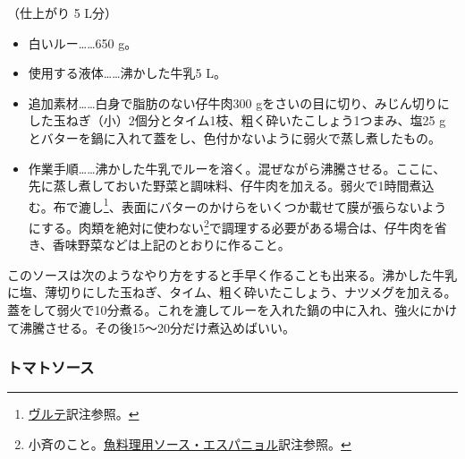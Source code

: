 \begin{recette}


（仕上がり 5 L分）

\begin{itemize}
\item
  白いルー\ldots{}\ldots{}650 g。
\item
  使用する液体\ldots{}\ldots{}沸かした牛乳5 L。
\item
  追加素材\ldots{}\ldots{}白身で脂肪のない仔牛肉300
  gをさいの目に切り、みじん切りにした玉ねぎ（小）2個分とタイム1枝、粗く砕いたこしょう1つまみ、塩25
  g とバターを鍋に入れて蓋をし、色付かないように弱火で蒸し煮したもの。
\item
  作業手順\ldots{}\ldots{}沸かした牛乳でルーを溶く。混ぜながら沸騰させる。ここに、先に蒸し煮しておいた野菜と調味料、仔牛肉を加える。弱火で1時間煮込む。布で漉し\footnote{\protect\hyperlink{veloute}{ヴルテ}訳注参照。}、表面にバターのかけらをいくつか載せて膜が張らないようにする。肉類を絶対に使わない\footnote{小斉のこと。\protect\hyperlink{sauce-espagnole-maigre}{魚料理用ソース・エスパニョル}訳注参照。}で調理する必要がある場合は、仔牛肉を省き、香味野菜などは上記のとおりに作ること。
\end{itemize}

このソースは次のようなやり方をすると手早く作ることも出来る。沸かした牛乳に塩、薄切りにした玉ねぎ、タイム、粗く砕いたこしょう、ナツメグを加える。蓋をして弱火で10分煮る。これを漉してルーを入れた鍋の中に入れ、強火にかけて沸騰させる。その後15〜20分だけ煮込めばいい。

\hypertarget{sauce-tomate}{%
\subsubsection{トマトソース}\label{sauce-tomate}}




\end{recette}
